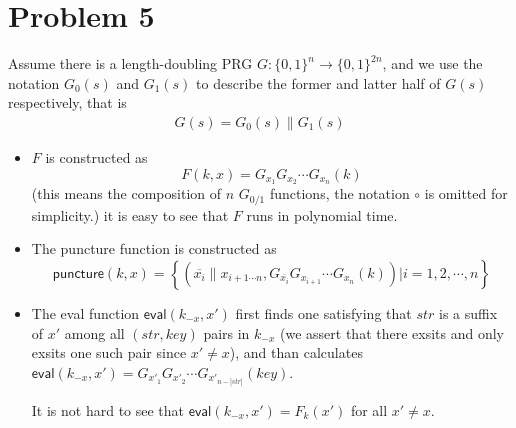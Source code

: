 \documentclass[8pt]{article}
\theoremstyle{compact}
\begin{document}
\section*{Problem 5}
Assume there is a length-doubling PRG $G: \{0, 1\}^n \to \{0, 1\}^{2n}$, and we use the notation $G_0(s)$ and $G_1(s)$ to describe the former and latter half of $G(s)$ respectively, that is \begin{align*}
	G(s) = G_0(s) \| G_1(s)
\end{align*}
\begin{itemize}
	\item $F$ is constructed as $$F(k, x) = G_{x_1} G_{x_2} \cdots G_{x_n}(k)$$ (this means the composition of $n$ $G_{0/1}$ functions, the notation $\circ$ is omitted for simplicity.) it is easy to see that $F$ runs in polynomial time.
	\item The puncture function is constructed as $$\textsf{puncture}(k, x) = \left\{\left(\overline{x_i} \| x_{i+1 \cdots n}, G_{\overline{x_i}} G_{x_{i+1}} \cdots G_{x_n}(k)\right) \bigg| i = 1, 2, \cdots, n\right\}$$
	\item The eval function $\textsf{eval}(k_{-x}, x')$ first finds one satisfying that $str$ is a suffix of $x'$ among all $(str, key)$ pairs in $k_{-x}$ (we assert that there exsits and only exsits one such pair since $x' \neq x$), and than calculates $\textsf{eval}(k_{-x}, x') = G_{x'_1} G_{x'_2} \cdots G_{x'_{n-|str|}}(key)$.
	
	It is not hard to see that $\textsf{eval}(k_{-x}, x') = F_k(x')$ for all $x' \neq x$.
\end{itemize}
\end{document}
